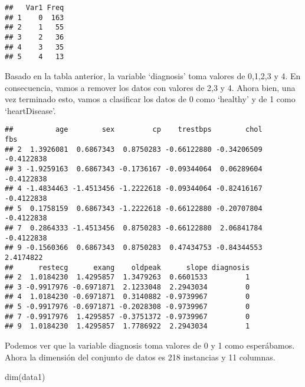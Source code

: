 \documentclass[
]{article}
\newenvironment{Shaded}{\begin{snugshade}}{\end{snugshade}}
\newcommand{\FunctionTok}[1]{\textcolor[rgb]{0.00,0.00,0.00}{#1}}
\newcommand{\NormalTok}[1]{#1}
\newcommand{\OtherTok}[1]{\textcolor[rgb]{0.56,0.35,0.01}{#1}}
\newcommand{\SpecialCharTok}[1]{\textcolor[rgb]{0.00,0.00,0.00}{#1}}
\newcommand{\StringTok}[1]{\textcolor[rgb]{0.31,0.60,0.02}{#1}}
\begin{document}
\begin{verbatim}
##   Var1 Freq
## 1    0  163
## 2    1   55
## 3    2   36
## 4    3   35
## 5    4   13
\end{verbatim}

Basado en la tabla anterior, la variable `diagnosis' toma valores de
0,1,2,3 y 4. En consecuencia, vamos a remover los datos con valores de
2,3 y 4. Ahora bien, una vez terminado esto, vamos a clasificar los
datos de 0 como `healthy' y de 1 como `heartDisease'.

\begin{Shaded}
\end{Shaded}

\begin{verbatim}
##          age        sex         cp    trestbps        chol        fbs
## 2  1.3926081  0.6867343  0.8750283 -0.66122880 -0.34206509 -0.4122838
## 3 -1.9259163  0.6867343 -0.1736167 -0.09344064  0.06289604 -0.4122838
## 4 -1.4834463 -1.4513456 -1.2222618 -0.09344064 -0.82416167 -0.4122838
## 5  0.1758159  0.6867343 -1.2222618 -0.66122880 -0.20707804 -0.4122838
## 7  0.2864333 -1.4513456  0.8750283 -0.66122880  2.06841784 -0.4122838
## 9 -0.1560366  0.6867343  0.8750283  0.47434753 -0.84344553  2.4174822
##      restecg      exang    oldpeak      slope diagnosis
## 2  1.0184230  1.4295857  1.3479263  0.6601533         1
## 3 -0.9917976 -0.6971871  2.1233048  2.2943034         0
## 4  1.0184230 -0.6971871  0.3140882 -0.9739967         0
## 5 -0.9917976 -0.6971871 -0.2028308 -0.9739967         0
## 7 -0.9917976  1.4295857 -0.3751372 -0.9739967         0
## 9  1.0184230  1.4295857  1.7786922  2.2943034         1
\end{verbatim}

Podemos ver que la variable diagnosis toma valores de 0 y 1 como
esperábamos. Ahora la dimensión del conjunto de datos es 218 instancias
y 11 columnas.

\begin{Shaded}
\begin{Highlighting}[]
\FunctionTok{dim}\NormalTok{(data1)}
\end{Highlighting}
\end{Shaded}
\end{document}
